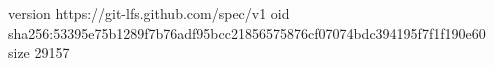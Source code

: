 version https://git-lfs.github.com/spec/v1
oid sha256:53395e75b1289f7b76adf95bcc21856575876cf07074bdc394195f7f1f190e60
size 29157
